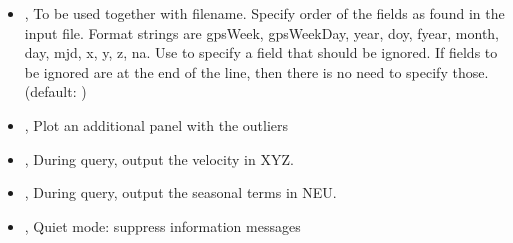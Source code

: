 \documentclass[letterpaper,10pt,english]{sphinxmanual}
\begin{document}
\begin{itemize}
\item {} 
\sphinxAtStartPar
{\hyperref[\detokenize{pgamit.com:PlotETM.py--format}]{}} , {\hyperref[\detokenize{pgamit.com:PlotETM.py---format}]{}}  \sphinxhyphen{} To be used together with \textendash{}filename. Specify order of the fields as found in the input file. Format strings are gpsWeek, gpsWeekDay, year, doy, fyear, month, day, mjd, x, y, z, na. Use  to specify a field that should be ignored. If fields to be ignored are at the end of the line, then there is no need to specify those. (default: )

\item {} 
\sphinxAtStartPar
{\hyperref[\detokenize{pgamit.com:PlotETM.py--outliers}]{}}, {\hyperref[\detokenize{pgamit.com:PlotETM.py---plot_outliers}]{}} \sphinxhyphen{} Plot an additional panel with the outliers

\item {} 
\sphinxAtStartPar
{\hyperref[\detokenize{pgamit.com:PlotETM.py--vel}]{}}, {\hyperref[\detokenize{pgamit.com:PlotETM.py---velocity}]{}} \sphinxhyphen{} During query, output the velocity in XYZ.

\item {} 
\sphinxAtStartPar
{\hyperref[\detokenize{pgamit.com:PlotETM.py--seasonal}]{}}, {\hyperref[\detokenize{pgamit.com:PlotETM.py---seasonal_terms}]{}} \sphinxhyphen{} During query, output the seasonal terms in NEU.

\item {} 
\sphinxAtStartPar
{\hyperref[\detokenize{pgamit.com:PlotETM.py--quiet}]{}}, {\hyperref[\detokenize{pgamit.com:PlotETM.py---suppress_messages}]{}} \sphinxhyphen{} Quiet mode: suppress information messages

\end{itemize}
\end{document}
